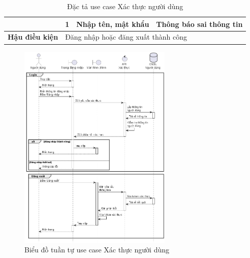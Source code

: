 \documentclass[../DoAn.tex]{subfiles}
\begin{document}
\begin{table}[H]
\begin{tabularx}{\textwidth}{|l|c|X|X|}
                                                 & \multirow{1}{*}{\textbf{1}}                               & Nhập tên, mật khẩu                      & Thông báo sai thông tin                         \\ \hline
        \textbf{Hậu điều kiện}                   & \multicolumn{3}{l|}{Đăng nhập hoặc đăng xuất thành công}                                                                                              \\ \hline
    \end{tabularx}
    \caption{Đặc tả use case Xác thực người dùng}
    \label{table:uc-authentication}
\end{table}

\begin{figure}[H]
    \centering
    \includegraphics[width=0.65\textwidth]{Hinhve/sequences/Authentication.png}
    \caption{Biểu đồ tuần tự use case Xác thực người dùng}
    \label{figure:sd-authentication}
\end{figure}
\break
\end{document}
